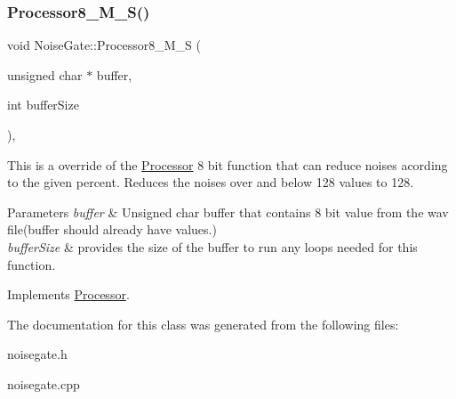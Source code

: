 \subsubsection{\texorpdfstring{Processor8\+\_\+\+M\+\_\+\+S()}{Processor8\_M\_S()}}
{\footnotesize\ttfamily void Noise\+Gate\+::\+Processor8\+\_\+\+M\+\_\+S (\begin{DoxyParamCaption}\item[{unsigned char $\ast$}]{buffer,  }\item[{int}]{buffer\+Size }\end{DoxyParamCaption})\hspace{0.3cm}{\ttfamily [override]}, {\ttfamily [virtual]}}



This is a override of the \hyperlink{classProcessor}{Processor} 8 bit function that can reduce noises acording to the given percent. Reduces the noises over and below 128 values to 128. 


\begin{DoxyParams}{Parameters}
{\em buffer} & Unsigned char buffer that contains 8 bit value from the wav file(buffer should already have values.) \\
\hline
{\em buffer\+Size} & provides the size of the buffer to run any loops needed for this function. \\
\hline
\end{DoxyParams}


Implements \hyperlink{classProcessor_a5a977cc3596fdeac860d5e28a99806a1}{Processor}.



The documentation for this class was generated from the following files\+:\begin{DoxyCompactItemize}
\item 
noisegate.\+h\item 
noisegate.\+cpp\end{DoxyCompactItemize}

